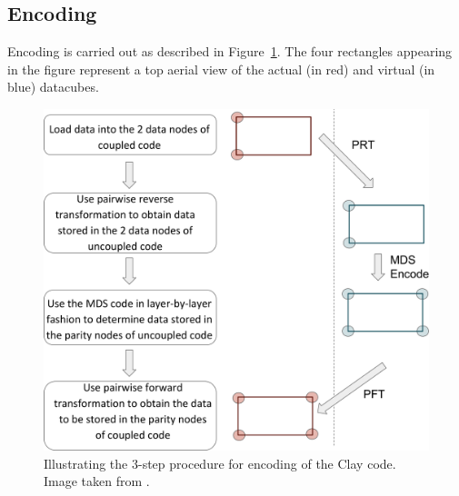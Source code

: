 \begin{multicols}{2}
 \subsection{Encoding} 
 Encoding is carried out as described in Figure~\ref{fig:encoding42}.   The four rectangles appearing in the figure represent a top aerial view of the actual (in red) and virtual (in blue) datacubes.
\end{multicols}

\begin{figure}[H]
\centering
\includegraphics[scale=.58]{src/Figures/chap4/encoding42.jpg}  
\caption{Illustrating the $3$-step procedure for encoding of the Clay code.  Image taken from \cite{VajhaFAST18}.}  \label{fig:encoding42}    
\end{figure}

\newpage


